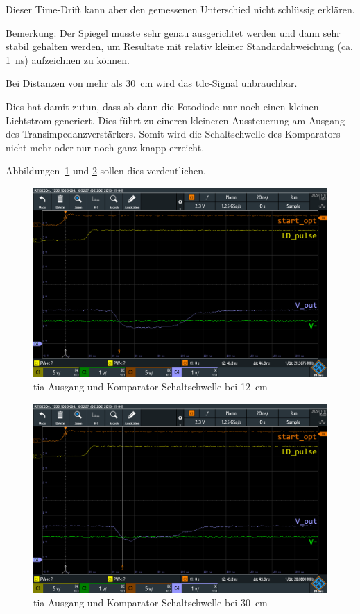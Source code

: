 Dieser Time-Drift kann aber den gemessenen Unterschied nicht schlüssig erklären.

Bemerkung: Der Spiegel musste sehr genau ausgerichtet werden und dann sehr stabil gehalten werden, um Resultate mit
relativ kleiner Standardabweichung (ca. 1~ns) aufzeichnen zu können.

Bei Distanzen von mehr als 30~cm wird das \acrshort{tdc}-Signal unbrauchbar.

Dies hat damit zutun, dass ab dann die Fotodiode nur noch einen kleinen Lichtstrom generiert. Dies führt zu eineren
kleineren Aussteuerung am Ausgang des Transimpedanzverstärkers. Somit wird die Schaltschwelle des Komparators nicht mehr
oder nur noch ganz knapp erreicht.

Abbildungen~\ref{fig:spiegel_12cm_dso_ok} und \ref{fig:spiegel_30cm_dso_nok} sollen dies verdeutlichen.

\begin{figure}[H]
    \centering
    \includegraphics[width=\textwidth]{graphics/spiegel_12cm_dso_ok.png}
    \caption{\acrshort{tia}-Ausgang und Komparator-Schaltschwelle bei 12~cm}\label{fig:spiegel_12cm_dso_ok}
\end{figure}

\begin{figure}[H]
    \centering
    \includegraphics[width=\textwidth]{graphics/spiegel_30cm_dso_nok.png}
    \caption{\acrshort{tia}-Ausgang und Komparator-Schaltschwelle bei 30~cm}\label{fig:spiegel_30cm_dso_nok}
\end{figure}

